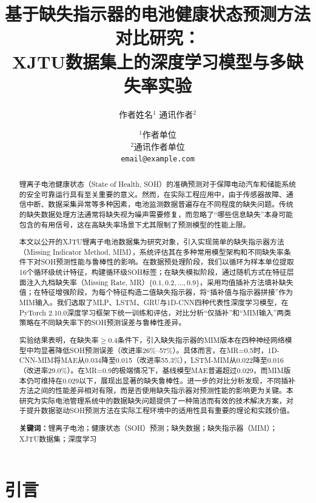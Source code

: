 \documentclass[10pt,a4paper]{ctexart}
\title{\textbf{基于缺失指示器的电池健康状态预测方法对比研究：\\XJTU数据集上的深度学习模型与多缺失率实验}}
\author{作者姓名$^{1}$ \quad 通讯作者$^{2}$}
\date{$^{1}$作者单位 \\ $^{2}$通讯作者单位 \\ \texttt{email@example.com}}
\begin{document}
\maketitle

\begin{abstract}
锂离子电池健康状态（State of Health, SOH）的准确预测对于保障电动汽车和储能系统的安全可靠运行具有至关重要的意义。然而，在实际工程应用中，由于传感器故障、通信中断、数据采集异常等多种因素，电池监测数据普遍存在不同程度的缺失问题。传统的缺失数据处理方法通常将缺失视为噪声需要修复，而忽略了“哪些信息缺失”本身可能包含的有用信号，这在高缺失率场景下尤其限制了预测模型的性能上限。

本文以公开的XJTU锂离子电池数据集为研究对象，引入实现简单的缺失指示器方法（Missing Indicator Method, MIM），系统评估其在多种常用模型架构和不同缺失率条件下对SOH预测性能与鲁棒性的影响。在数据预处理阶段，我们以循环为样本单位提取16个循环级统计特征，构建循环级SOH标签；在缺失模拟阶段，通过随机方式在特征层面注入九档缺失率（Missing Rate, MR）$\{0.1, 0.2, \ldots, 0.9\}$，采用均值插补方法填补缺失值；在特征增强阶段，为每个特征构造二值缺失指示器，将“插补值与指示器拼接”作为MIM输入。我们选取了MLP、LSTM、GRU与1D-CNN四种代表性深度学习模型，在PyTorch 2.10.0深度学习框架下统一训练和评估，对比分析“仅插补”和“MIM输入”两类策略在不同缺失率下的SOH预测误差与鲁棒性差异。

实验结果表明，在缺失率$\geq 0.4$条件下，引入缺失指示器的MIM版本在四种神经网络模型中均显著降低SOH预测误差（改进率26\%--57\%）。具体而言，在MR=0.5时，1D-CNN-MIM将MAE从0.034降至0.015（改进率55.3\%），LSTM-MIM从0.022降至0.016（改进率29.0\%）。在MR=0.9的极端情况下，基线模型MAE普遍超过0.029，而MIM版本仍可维持在0.029以下，展现出显著的缺失鲁棒性。进一步的对比分析发现，不同插补方法之间的性能差异相对有限，而是否使用缺失指示器对预测性能的影响更为关键。本研究为实际电池管理系统中的数据缺失问题提供了一种简洁而有效的技术解决方案，对于提升数据驱动SOH预测方法在实际工程环境中的适用性具有重要的理论和实践价值。

\textbf{关键词：}锂离子电池；健康状态（SOH）预测；缺失数据；缺失指示器（MIM）；XJTU数据集；深度学习
\end{abstract}

\section{引言}\label{sec:intro}
\end{document}

